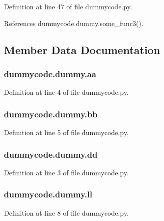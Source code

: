 Definition at line 47 of file dummycode.\-py.



References dummycode.\-dummy.\-some\-\_\-func3().



\subsection{Member Data Documentation}
\subsubsection[{aa}]{\setlength{\rightskip}{0pt plus 5cm}dummycode.\-dummy.\-aa}\label{classdummycode_1_1dummy_ade8c2a23728fea407400de565af9d924}


Definition at line 4 of file dummycode.\-py.

\subsubsection[{bb}]{\setlength{\rightskip}{0pt plus 5cm}dummycode.\-dummy.\-bb}\label{classdummycode_1_1dummy_a8fc4a473d7dc65b38abc8ca2bbf56d0c}


Definition at line 5 of file dummycode.\-py.

\subsubsection[{dd}]{\setlength{\rightskip}{0pt plus 5cm}dummycode.\-dummy.\-dd}\label{classdummycode_1_1dummy_af2feb69e325549343d505d0f5afaacd0}


Definition at line 3 of file dummycode.\-py.

\subsubsection[{ll}]{\setlength{\rightskip}{0pt plus 5cm}dummycode.\-dummy.\-ll}\label{classdummycode_1_1dummy_aff4159330a4c573597b401b5503818d7}


Definition at line 8 of file dummycode.\-py.

